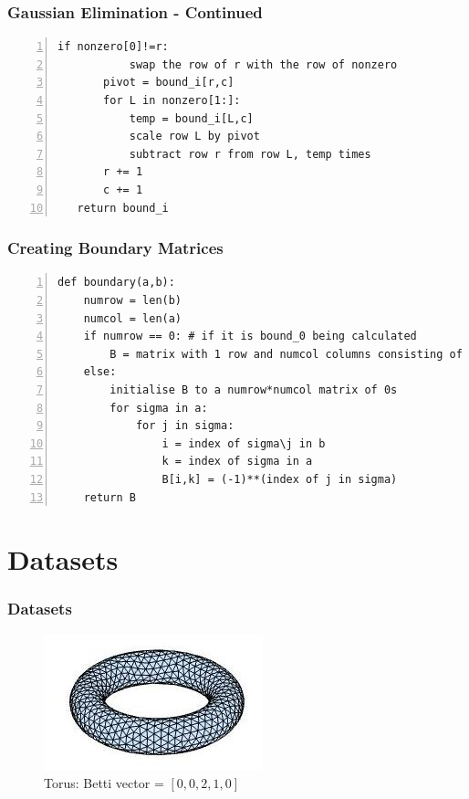 \documentclass{beamer}
\begin{document}
\begin{frame}[fragile]
\frametitle{Gaussian Elimination - Continued}
\begin{lstlisting}[numbers=left]
       if nonzero[0]!=r:
           swap the row of r with the row of nonzero
       pivot = bound_i[r,c]
       for L in nonzero[1:]:
           temp = bound_i[L,c]
           scale row L by pivot
           subtract row r from row L, temp times
       r += 1
       c += 1
   return bound_i
\end{lstlisting}
\end{frame}

\begin{frame}[fragile]
\frametitle{Creating Boundary Matrices}
\begin{lstlisting}[numbers=left]
def boundary(a,b):
    numrow = len(b)
    numcol = len(a)
    if numrow == 0: # if it is bound_0 being calculated
        B = matrix with 1 row and numcol columns consisting of 1s
    else:
        initialise B to a numrow*numcol matrix of 0s 
        for sigma in a:
            for j in sigma:
                i = index of sigma\j in b
                k = index of sigma in a
                B[i,k] = (-1)**(index of j in sigma) 
    return B
\end{lstlisting}
\end{frame}

\section{Datasets}
\begin{frame}
\frametitle{Datasets}
\begin{figure}
\center
\includegraphics[scale=0.5]{torus.jpg}
\caption{Torus: Betti vector = $[0,0,2,1,0]$}
\end{figure}
\end{frame}
\end{document}
